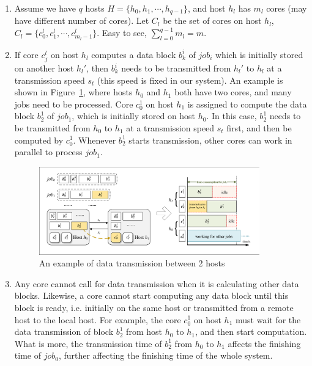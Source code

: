 \documentclass{llncs}
\begin{document}
\begin{enumerate}

  \item Assume we have $q$ hosts $H=\{h_0, h_1, \cdots, h_{q-1}\}$, and host $h_l$ has $m_l$ cores (may have different number of cores). Let $C_l$ be the set of cores on host $h_l$, $C_l = \{c^l_0, c^l_1, \cdots, c^l_{m_l-1}\}$. Easy to see, $\sum_{l=0}^{q-1} m_l = m$.
  
  \vspace{2mm}

  \item If core $c^l_j$ on host $h_l$ computes a data block $b^i_{k}$ of $job_i$ which is initially stored on another host $h_l'$, then $b^i_{k}$ needs to be transmitted from $h_l'$ to $h_l$ at a transmission speed $s_t$ (this speed is fixed in our system). An example is shown in Figure~\ref{Fig-Transmission}, where hosts $h_0$ and $h_1$ both have two cores, and many jobs need to be processed. Core $c^1_0$ on host $h_1$ is assigned to compute the data block $b^1_2$ of $job_1$, which is initially stored on host $h_0$. In this case, $b^1_2$ needs to be transmitted from $h_0$ to $h_1$ at a transmission speed $s_t$ first, and then be computed by $c^1_0$. Whenever $b^1_2$ starts transmission, other cores can work in parallel to process $job_1$.
  
  \begin{figure}[H]
  \begin{center}
  \includegraphics[width=0.9\textwidth]{Fig-Transmission.pdf}
  \caption{An example of data transmission between 2 hosts}
  \label{Fig-Transmission}
  \end{center}
  \end{figure}

  \item Any core cannot call for data transmission when it is calculating other data blocks. Likewise, a core cannot start computing any data block until this block is ready, i.e. initially on the same host or transmitted from a remote host to the local host. For example, the core $c^1_0$ on host $h_1$ must wait for the data transmission of block $b^1_2$ from host $h_0$ to $h_1$, and then start computation. What is more, the transmission time of $b^1_2$ from $h_0$ to $h_1$ affects the finishing time of $job_0$, further affecting the finishing time of the whole system. 
  

\end{enumerate}
\end{document}
